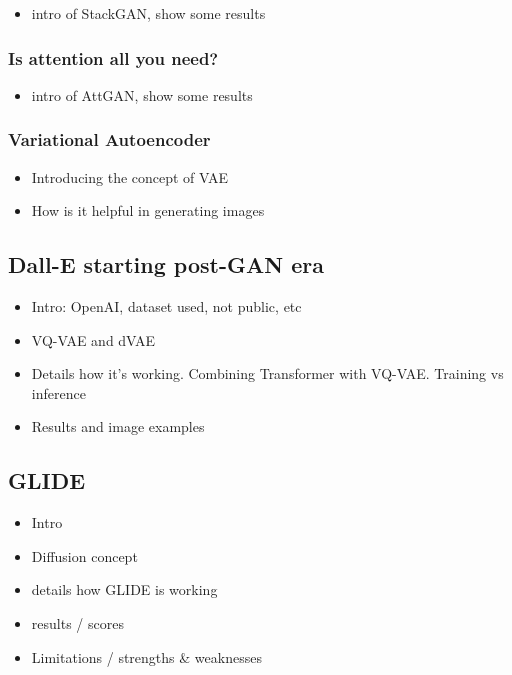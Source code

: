 \documentclass[
]{krantz}
\providecommand{\tightlist}{%
  \setlength{\itemsep}{0pt}\setlength{\parskip}{0pt}}
\begin{document}
\begin{itemize}
\tightlist
\item
  intro of StackGAN, show some results
\end{itemize}

\hypertarget{is-attention-all-you-need}{%
\subsubsection{Is attention all you need?}\label{is-attention-all-you-need}}

\begin{itemize}
\tightlist
\item
  intro of AttGAN, show some results
\end{itemize}

\hypertarget{variational-autoencoder}{%
\subsubsection{Variational Autoencoder}\label{variational-autoencoder}}

\begin{itemize}
\tightlist
\item
  Introducing the concept of VAE
\item
  How is it helpful in generating images
\end{itemize}

\hypertarget{dall-e-starting-post-gan-era}{%
\subsection{Dall-E starting post-GAN era}\label{dall-e-starting-post-gan-era}}

\begin{itemize}
\tightlist
\item
  Intro: OpenAI, dataset used, not public, etc
\item
  VQ-VAE and dVAE
\item
  Details how it's working. Combining Transformer with VQ-VAE. Training vs inference
\item
  Results and image examples
\end{itemize}

\hypertarget{glide}{%
\subsection{GLIDE}\label{glide}}

\begin{itemize}
\tightlist
\item
  Intro
\item
  Diffusion concept
\item
  details how GLIDE is working
\item
  results / scores
\item
  Limitations / strengths \& weaknesses
\end{itemize}
\end{document}
